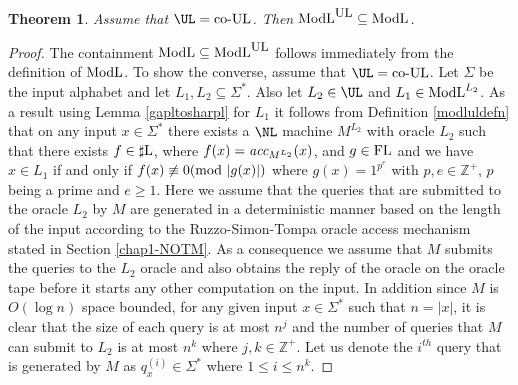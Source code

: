 \documentclass{amsbook}
\newtheorem{theorem}{Theorem}[chapter]
\theoremstyle{definition}
\theoremstyle{remark}
\numberwithin{section}{chapter}
\numberwithin{equation}{chapter}
\newcommand{\coUL}{\mbox{\rm co-UL}}
\newcommand{\ULredn}{\mbox{\small{\rm UL}}}
\newcommand{\sharpL}{\mbox{$\sharp$\rm L}}
\newcommand{\ModL}{\mbox{\rm ModL}}
\newcommand{\FL}{\mbox{\rm FL}}
\renewcommand{\mod}{\mbox{\textrm mod~}}
\newcommand{\Z}{\mathbb{Z}}
\newcommand{\acc}{\mbox{\it acc}}
\begin{document}
\begin{theorem}\label{modlulT}
Assume that $\UL =\coUL$. Then $\ModL ^{\ULredn}\subseteq\ModL$.
\end{theorem}
\begin{proof}
The containment $\ModL\subseteq\ModL^{\ULredn}$ follows immediately from the definition of $\ModL$. To show the converse, assume that $\UL =\coUL$. Let $\Sigma$ be the input alphabet and let $L_1,L_2\subseteq\Sigma^{*}$. Also let $L_2\in\UL$ and $L_1\in\ModL^{L_2}$. As a result using Lemma \ref{gapltosharpl} for $L_1$ it follows from Definition \ref{modluldefn} that on any input $x\in\Sigma^{*}$ there exists a $\NL$ machine $M^{L_2}$ with oracle $L_2$ such that there exists $f\in\sharpL$, where $f(x)=\acc_{M^{L_2}}(x)$, and $g\in\FL$ and we have $x\in L_1$ if and only if $f(x)\not\equiv 0(\mod |g(x)|)$ where $g(x)=1^{p^e}$ with $p,e\in\Z^{+}$, $p$ being a prime and $e\geq 1$. Here we assume that the queries that are submitted to the oracle $L_2$ by $M$ are generated in a deterministic manner based on the length of the input according to the Ruzzo-Simon-Tompa oracle access mechanism stated in Section \ref{chap1-NOTM}. As a consequence we assume that $M$ submits the queries to the $L_2$ oracle and also obtains the reply of the oracle on the oracle tape before it starts any other computation on the input. In addition since $M$ is $O(\log n)$ space bounded, for any given input $x\in\Sigma^{*}$ such that $n=|x|$, it is clear that the size of each query is at most $n^j$ and the number of queries that $M$ can submit to $L_2$ is at most $n^k$ where $j,k\in\Z^{+}$. Let us denote the $i^{th}$ query that is generated by $M$ as $q_x^{(i)}\in\Sigma^{*}$ where $1\leq i\leq n^k$.


\end{proof}
\end{document}
